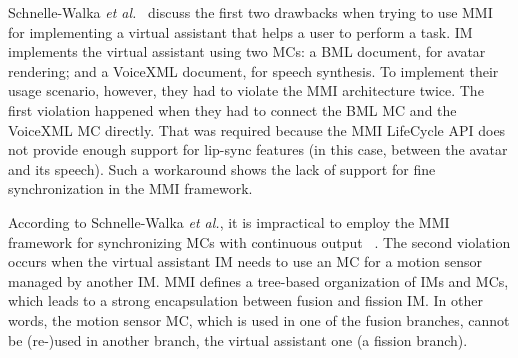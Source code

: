 Schnelle-Walka \textit{et al.}~\cite{schnelle-walka_jvoicexml_2013} discuss the first
two drawbacks when trying to use MMI for implementing a virtual assistant that
helps a user to perform a task. IM implements the virtual assistant using two
MCs: a BML document, for avatar rendering; and a VoiceXML document, for speech synthesis. To
implement their usage scenario, however, they had to violate the MMI
architecture twice. The first violation happened when they had to connect the
BML MC and the VoiceXML MC directly. That was required because the MMI LifeCycle
API does not provide enough support for lip-sync features (in this case, between
the avatar and its speech). Such a workaround shows the lack of support for fine
synchronization in the MMI framework.

According to Schnelle-Walka \textit{et al.}, it is impractical to employ the MMI
framework for synchronizing MCs with continuous output
~\cite{schnelle-walka_jvoicexml_2013}. The second violation occurs when the
virtual assistant IM needs to use an MC for a motion sensor managed by another
IM. MMI defines a tree-based organization of IMs and MCs, which leads to a
strong encapsulation between fusion and fission IM. In other words, the motion
sensor MC, which is used in one of the fusion branches, cannot be (re-)used in
another branch, the virtual assistant one (a fission branch).